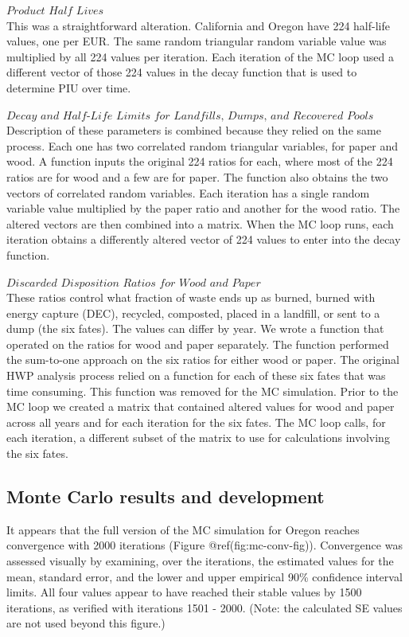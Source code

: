 \documentclass[
  openany]{book}
\begin{document}
\(\textit{Product Half Lives}\)\\
This was a straightforward alteration. California and Oregon have 224
half-life values, one per EUR. The same random triangular random
variable value was multiplied by all 224 values per iteration. Each
iteration of the MC loop used a different vector of those 224 values in
the decay function that is used to determine PIU over time.

\(\textit{Decay and Half-Life Limits for Landfills, Dumps, and Recovered Pools}\)\\
Description of these parameters is combined because they relied on the
same process. Each one has two correlated random triangular variables,
for paper and wood. A function inputs the original 224 ratios for each,
where most of the 224 ratios are for wood and a few are for paper. The
function also obtains the two vectors of correlated random variables.
Each iteration has a single random variable value multiplied by the
paper ratio and another for the wood ratio. The altered vectors are then
combined into a matrix. When the MC loop runs, each iteration obtains a
differently altered vector of 224 values to enter into the decay
function.

\(\textit{Discarded Disposition Ratios for Wood and Paper}\)\\
These ratios control what fraction of waste ends up as burned, burned
with energy capture (DEC), recycled, composted, placed in a landfill, or
sent to a dump (the six fates). The values can differ by year. We wrote
a function that operated on the ratios for wood and paper separately.
The function performed the sum-to-one approach on the six ratios for
either wood or paper. The original HWP analysis process relied on a
function for each of these six fates that was time consuming. This
function was removed for the MC simulation. Prior to the MC loop we
created a matrix that contained altered values for wood and paper across
all years and for each iteration for the six fates. The MC loop calls,
for each iteration, a different subset of the matrix to use for
calculations involving the six fates.

\hypertarget{model-mc-res}{%
\subsection{Monte Carlo results and development}\label{model-mc-res}}

It appears that the full version of the MC simulation for Oregon reaches
convergence with 2000 iterations (Figure @ref(fig:mc-conv-fig)).
Convergence was assessed visually by examining, over the iterations, the
estimated values for the mean, standard error, and the lower and upper
empirical 90\% confidence interval limits. All four values appear to
have reached their stable values by 1500 iterations, as verified with
iterations 1501 - 2000. (Note: the calculated SE values are not used
beyond this figure.)
\end{document}
